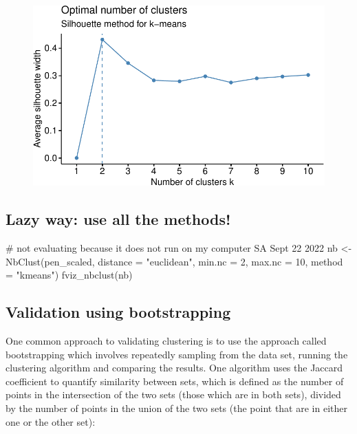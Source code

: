 \documentclass[
  letterpaper,
  DIV=11,
  numbers=noendperiod]{scrreprt}
\newenvironment{Shaded}{\begin{snugshade}}{\end{snugshade}}
\newcommand{\AttributeTok}[1]{\textcolor[rgb]{0.40,0.45,0.13}{#1}}
\newcommand{\CommentTok}[1]{\textcolor[rgb]{0.37,0.37,0.37}{#1}}
\newcommand{\DecValTok}[1]{\textcolor[rgb]{0.68,0.00,0.00}{#1}}
\newcommand{\FunctionTok}[1]{\textcolor[rgb]{0.28,0.35,0.67}{#1}}
\newcommand{\NormalTok}[1]{\textcolor[rgb]{0.00,0.23,0.31}{#1}}
\newcommand{\OtherTok}[1]{\textcolor[rgb]{0.00,0.23,0.31}{#1}}
\newcommand{\StringTok}[1]{\textcolor[rgb]{0.13,0.47,0.30}{#1}}
\begin{document}
\begin{figure}[H]

{\centering \includegraphics{./12-clustering_files/figure-pdf/unnamed-chunk-14-1.pdf}

}

\end{figure}

\hypertarget{lazy-way-use-all-the-methods}{%
\subsection{Lazy way: use all the
methods!}\label{lazy-way-use-all-the-methods}}

\begin{Shaded}
\begin{Highlighting}[]
\CommentTok{\# not evaluating because it does not run on my computer SA Sept 22 2022}
\NormalTok{nb }\OtherTok{\textless{}{-}} \FunctionTok{NbClust}\NormalTok{(pen\_scaled, }\AttributeTok{distance =} \StringTok{"euclidean"}\NormalTok{, }\AttributeTok{min.nc =} \DecValTok{2}\NormalTok{,}
        \AttributeTok{max.nc =} \DecValTok{10}\NormalTok{, }\AttributeTok{method =} \StringTok{"kmeans"}\NormalTok{)}
\FunctionTok{fviz\_nbclust}\NormalTok{(nb)}
\end{Highlighting}
\end{Shaded}

\hypertarget{validation-using-bootstrapping}{%
\subsection{Validation using
bootstrapping}\label{validation-using-bootstrapping}}

One common approach to validating clustering is to use the approach
called bootstrapping which involves repeatedly sampling from the data
set, running the clustering algorithm and comparing the results. One
algorithm uses the Jaccard coefficient to quantify similarity between
sets, which is defined as the number of points in the intersection of
the two sets (those which are in both sets), divided by the number of
points in the union of the two sets (the point that are in either one or
the other set):
\end{document}
